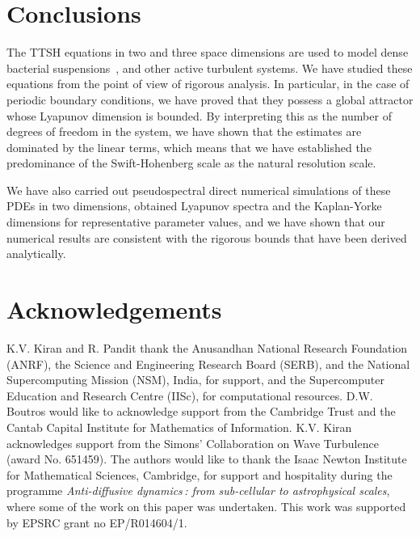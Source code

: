 \documentclass[11pt]{amsart}
\theoremstyle{definition}
\numberwithin{equation}{section}
\numberwithin{equation}{section}
\begin{document}
\section{\large Conclusions}\label{conclusions}

The TTSH equations in two and three space dimensions are used to model dense bacterial suspensions~\cite{AJC2020,ACJ2022,Pandit_2025}, and other active turbulent systems. We have studied these equations from the point of view of rigorous analysis. In particular, in the case of periodic boundary conditions, we have proved that they possess a global attractor whose Lyapunov dimension is bounded. By interpreting this as the number of degrees of freedom in the system, we have shown that the estimates are dominated by the linear terms, which means that we have established the predominance of the Swift-Hohenberg scale as the natural resolution scale.
\par\smallskip%
We have also carried out pseudospectral direct numerical simulations of these PDEs in two dimensions, obtained Lyapunov spectra and the Kaplan-Yorke dimensions for representative parameter values, and we have shown that our numerical results are consistent with the rigorous bounds that have been derived analytically.

\section{\large Acknowledgements}\label{acknowl}

K.V. Kiran and R. Pandit thank the Anusandhan National Research Foundation (ANRF), the Science and Engineering Research Board (SERB), and the National Supercomputing Mission (NSM), India, for support, and the Supercomputer Education and Research Centre (IISc), for computational resources. D.W. Boutros would like to acknowledge support from the Cambridge Trust and the Cantab Capital Institute for Mathematics of Information. K.V. Kiran acknowledges support from the Simons' Collaboration on Wave Turbulence (award No. 651459).
The authors would like to thank the Isaac Newton Institute for Mathematical Sciences, Cambridge, for support and hospitality during the programme \textit{Anti-diffusive dynamics\,: from sub-cellular to astrophysical scales}, where some of the work on this paper was undertaken. This work was supported by EPSRC grant no EP/R014604/1. 



\end{document}
